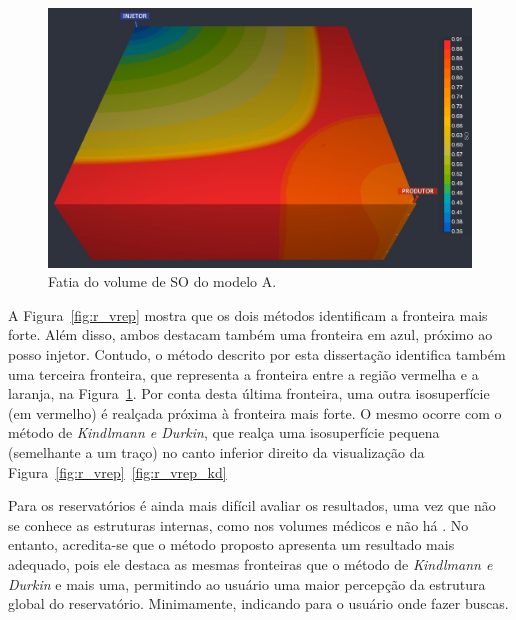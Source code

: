\begin{figure}[h]
	\centering
	\includegraphics[width=1\textwidth]{images/r_vrep_so_slice}
	\caption{Fatia do volume de SO do modelo A.}
	\label{fig:box_slice}
\end{figure}

	A Figura~\ref{fig:r_vrep} mostra que os dois métodos identificam a fronteira mais forte. Além disso, ambos destacam também uma fronteira em azul, próximo ao posso injetor. Contudo, o método descrito por esta dissertação identifica também uma terceira fronteira, que representa a fronteira entre a região vermelha e a laranja, na Figura~\ref{fig:box_slice}. Por conta desta última fronteira, uma outra isosuperfície (em vermelho) é realçada próxima à fronteira mais forte. O mesmo ocorre com o método de \textit{Kindlmann e Durkin}, que realça uma isosuperfície pequena (semelhante a um traço) no canto inferior direito da visualização da Figura~\ref{fig:r_vrep}~\ref{fig:r_vrep_kd}
	
	Para os reservatórios é ainda mais difícil avaliar os resultados, uma vez que não se conhece as estruturas internas, como nos volumes médicos e não há . No entanto, acredita-se que o método proposto apresenta um resultado mais adequado, pois ele destaca as mesmas fronteiras que o método de \textit{Kindlmann e Durkin} e mais uma, permitindo ao usuário uma maior percepção da estrutura global do reservatório. Minimamente, indicando para o usuário onde fazer buscas.

